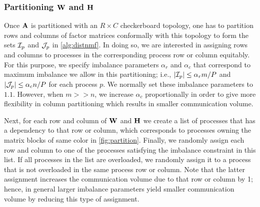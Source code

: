 \subsubsection{Partitioning $\mathbf{W}$ and $\mathbf{H}$}
Once $\mathbf{A}$ is partitioned with an $R \times C$ checkerboard topology, one has to partition rows and columns of factor matrices conformally with this topology to form the sets $\mathcal{I}_p$ and $\mathcal{J}_p$ in \cref{alg:distnmf}.
In doing so, we are interested in assigning rows and columns to processes in the corresponding process row or column equitably.
For this purpose, we specify imbalance parameters $\alpha_r$ and $\alpha_c$ that correspond to maximum imbalance we allow in this partitioning; i.e., $|\mathcal{I}_p| \le \alpha_r m / P$ and $|\mathcal{J}_p| \le \alpha_c n / P$ for each process $p$.
We normally set these imbalance parameters to $1.1$.
However, when $m >> n$, we increase $\alpha_c$ proportionally in order to give more flexibility in column partitioning which results in smaller communication volume.

Next, for each row and column of $\mathbf{W}$ and $\mathbf{H}$ we create a list of processes that has a dependency to that row or column, which corresponds to processes owning the matrix blocks of same color in \cref{fig:partition}.
Finally, we randomly assign each row and column to one of the processes satisfying the imbalance constraint in this list.
If all processes in the list are overloaded, we randomly assign it to a process that is not overloaded in the same process row or column.
Note that the latter assignment increases the communication volume due to that row or column by 1; hence, in general larger imbalance parameters yield smaller communication volume by reducing this type of assignment.

